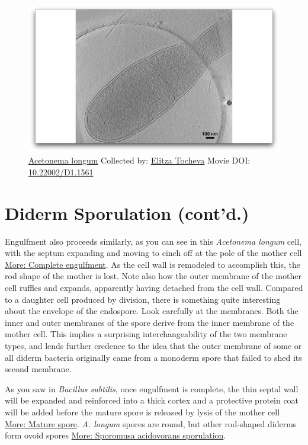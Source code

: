 \documentclass[]{tufte-book}
\begin{document}
\begin{figure}
\includegraphics{movie_stills/8_9} \caption[\protect\hyperlink{tree}{Acetonema longum} Collected by:
\protect\hyperlink{elitza_tocheva}{Elitza Tocheva} Movie DOI:
\href{https://doi.org/10.22002/D1.1561}{10.22002/D1.1561}]{\protect\hyperlink{tree}{Acetonema longum} Collected by:
\protect\hyperlink{elitza_tocheva}{Elitza Tocheva} Movie DOI:
\href{https://doi.org/10.22002/D1.1561}{10.22002/D1.1561}}\label{fig:8-9}
\end{figure}

\section{Diderm Sporulation (cont'd.)}\label{diderm-sporulation-contd.}

Engulfment also proceeds similarly, as you can see in this
\emph{Acetonema longum} cell, with the septum expanding and moving to
cinch off at the pole of the mother cell
\protect\hyperlink{Complete_engulfment}{More: Complete engulfment}. As
the cell wall is remodeled to accomplish this, the rod shape of the
mother is lost. Note also how the outer membrane of the mother cell
ruffles and expands, apparently having detached from the cell wall.
Compared to a daughter cell produced by division, there is something
quite interesting about the envelope of the endospore. Look carefully at
the membranes. Both the inner and outer membranes of the spore derive
from the inner membrane of the mother cell. This implies a surprising
interchangeability of the two membrane types, and lends further credence
to the idea that the outer membrane of some or all diderm bacteria
originally came from a monoderm spore that failed to shed its second
membrane.

As you saw in \emph{Bacillus subtilis}, once engulfment is complete, the
thin septal wall will be expanded and reinforced into a thick cortex and
a protective protein coat will be added before the mature spore is
released by lysis of the mother cell
\protect\hyperlink{Mature_spore}{More: Mature spore}. \emph{A. longum}
spores are round, but other rod-shaped diderms form ovoid spores
\protect\hyperlink{Sporomusa_acidovorans_sporulation}{More: Sporomusa
acidovorans sporulation}.
\end{document}

